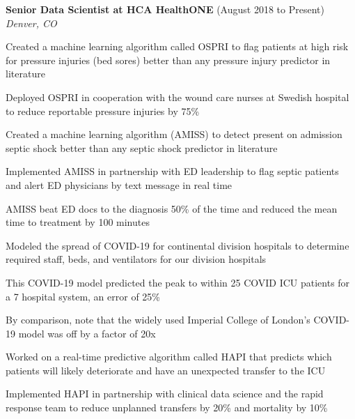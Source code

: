 \begin{resume}
    {\bf Senior Data Scientist at HCA HealthONE} (August 2018 to Present)\\\vspace{2mm}%
    \textit{Denver, CO}
    \begin{stuff}
        \vspace*{1mm}
                \item Created a machine learning algorithm called OSPRI to flag patients at high risk for pressure injuries (bed sores) better than any pressure injury predictor in literature 
                \item Deployed OSPRI in cooperation with the wound care nurses at Swedish hospital to reduce reportable pressure injuries by 75\%
                \item Created a machine learning algorithm (AMISS) to detect present on admission septic shock better than any septic shock predictor in literature
                \item Implemented AMISS in partnership with ED leadership to flag septic patients and alert ED physicians by text message in real time
                \item AMISS beat ED docs to the diagnosis 50\% of the time and reduced the mean time to treatment by 100 minutes
                \item Modeled the spread of COVID-19 for continental division hospitals to determine required staff, beds, and ventilators for our division hospitals 
                \item This COVID-19 model predicted the peak to within 25 COVID ICU patients for a 7 hospital system, an error of 25\%
                \item By comparison, note that the widely used Imperial College of London's COVID-19 model was off by a factor of 20x
                \item Worked on a real-time predictive algorithm called HAPI that predicts which patients will likely deteriorate and have an unexpected transfer to the ICU
                \item Implemented HAPI in partnership with clinical data science and the rapid response team to reduce unplanned transfers by 20\% and mortality by 10\% 

\end{stuff}
\end{resume}
